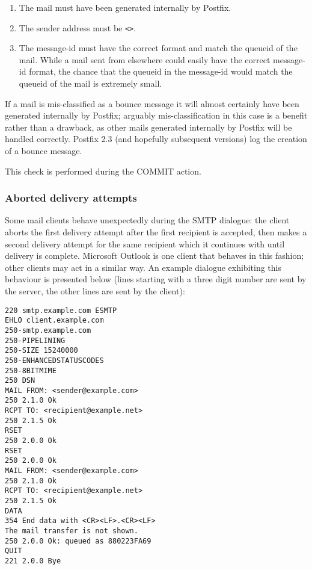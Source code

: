 \begin{enumerate}

    \item The mail must have been generated internally by Postfix.

    \item The sender address must be \verb!<>!.\glsadd{<>}

    \item The message-id must have the correct format and match the queueid
        of the mail.  While a mail sent from elsewhere could easily have
        the correct message-id format, the chance that the queueid in the
        message-id would match the queueid of the mail is extremely small.

\end{enumerate}

If a mail is mis-classified as a bounce message it will almost certainly
have been generated internally by Postfix; arguably mis-classification in
this case is a benefit rather than a drawback, as other mails generated
internally by Postfix will be handled correctly.  Postfix 2.3 (and
hopefully subsequent versions) log the creation of a bounce message.

This check is performed during the COMMIT action.

\subsubsection{Aborted delivery attempts}

\label{aborted-delivery-attempts}

Some mail clients behave unexpectedly during the \gls{SMTP} dialogue: the
client aborts the first delivery attempt after the first recipient is
accepted, then makes a second delivery attempt for the same recipient which
it continues with until delivery is complete.  Microsoft Outlook is one
client that behaves in this fashion; other clients may act in a similar
way.  An example dialogue exhibiting this behaviour is presented below
(lines starting with a three digit number are sent by the server, the other
lines are sent by the client):

\begin{verbatim}
220 smtp.example.com ESMTP
EHLO client.example.com
250-smtp.example.com
250-PIPELINING
250-SIZE 15240000
250-ENHANCEDSTATUSCODES
250-8BITMIME
250 DSN
MAIL FROM: <sender@example.com>
250 2.1.0 Ok
RCPT TO: <recipient@example.net>
250 2.1.5 Ok
RSET
250 2.0.0 Ok
RSET
250 2.0.0 Ok
MAIL FROM: <sender@example.com>
250 2.1.0 Ok
RCPT TO: <recipient@example.net>
250 2.1.5 Ok
DATA
354 End data with <CR><LF>.<CR><LF>
The mail transfer is not shown.
250 2.0.0 Ok: queued as 880223FA69
QUIT
221 2.0.0 Bye
\end{verbatim}

